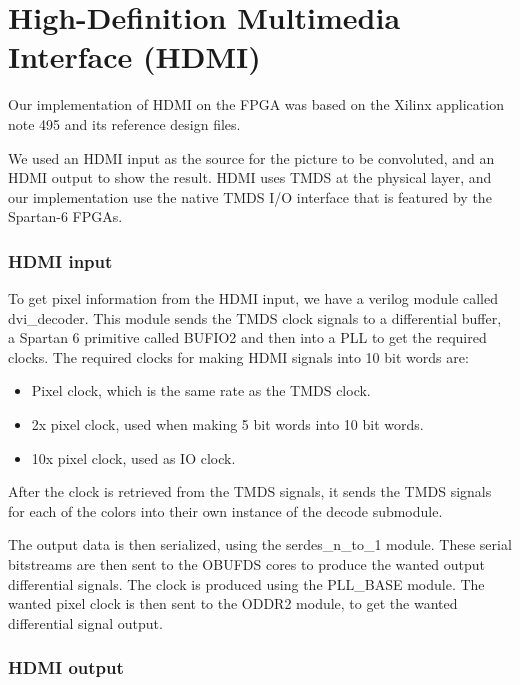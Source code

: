 \section{High-Definition Multimedia Interface (HDMI)}
Our implementation of HDMI on the FPGA was based on the Xilinx application note 495\cite{xapp495} and its reference design files.

We used an HDMI input as the source for the picture to be convoluted, and an HDMI output to show the result.
HDMI uses TMDS at the physical layer, and our implementation use the native TMDS I/O interface that is featured by the Spartan-6 FPGAs.

\subsubsection{HDMI input}
To get pixel information from the HDMI input, we have a verilog module called dvi\_decoder. This module sends the TMDS clock signals to a differential buffer, a Spartan 6 primitive called BUFIO2 and then into a PLL to get the required clocks. The required clocks for making HDMI signals into 10 bit words are:
\begin{itemize}
    \item   Pixel clock, which is the same rate as the TMDS clock.
    \item   2x pixel clock, used when making 5 bit words into 10 bit words.
    \item   10x pixel clock, used as IO clock.
\end{itemize}

After the clock is retrieved from the TMDS signals, it sends the TMDS signals for each of the colors into their own instance of the decode submodule.


The output data is then serialized, using the serdes\_n\_to\_1 module.
These serial bitstreams are then sent to the OBUFDS cores to produce the wanted output differential signals.
The clock is produced using the PLL\_BASE module.
The wanted pixel clock is then sent to the ODDR2 module, to get the wanted differential signal output.
\subsubsection{HDMI output}
